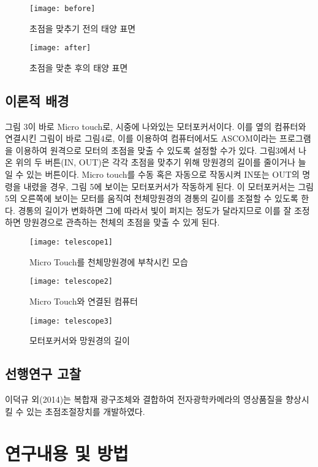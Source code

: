 \documentclass{abstract_hutech}
\begin{document}
\begin{figure}
\centering
\texttt{[image: before]}
\caption{초점을 맞추기 전의 태양 표면}
\label{fig:before}
\end{figure}

\begin{figure}
\centering
\texttt{[image: after]}
\caption{초점을 맞춘 후의 태양 표면}
\label{fig:after}
\end{figure}

\subsection{이론적 배경}

그림 3이 바로 Micro touch로, 시중에 나와있는 모터포커서이다. 이를 옆의 컴퓨터와 연결시킨 그림이 바로 그림4로, 이를 이용하여 컴퓨터에서도 ASCOM이라는 프로그램을 이용하여 원격으로 모터의 초점을 맞출 수 있도록 설정할 수가 있다. 그림3에서 나온 위의 두 버튼(IN, OUT)은 각각 초점을 맞추기 위해 망원경의 길이를 줄이거나 늘일 수 있는 버튼이다. Micro touch를 수동 혹은 자동으로 작동시켜 IN또는 OUT의 명령을 내렸을 경우, 그림 5에 보이는 모터포커서가 작동하게 된다. 이 모터포커서는 그림 5의 오른쪽에 보이는 모터를 움직여 천체망원경의 경통의 길이를 조절할 수 있도록 한다. 경통의 길이가 변화하면 그에 따라서 빛이 퍼지는 정도가 달라지므로 이를 잘 조정하면 망원경으로 관측하는 천체의 초점을 맞출 수 있게 된다.
\begin{figure}
\centering
\texttt{[image: telescope1]}
\caption{Micro Touch를 천체망원경에 부착시킨 모습}
\label{fig:telescope1}
\end{figure}

\begin{figure}
\centering
\texttt{[image: telescope2]}
\caption{Micro Touch와 연결된 컴퓨터}
\label{fig:telescope2}
\end{figure}

\begin{figure}
\centering
\texttt{[image: telescope3]}
\caption{모터포커서와 망원경의 길이}
\label{fig:telescope3}
\end{figure}

\subsection{선행연구 고찰}
이덕규 외(2014)는 복합재 광구조체와 결합하여 전자광학카메라의 영상품질을 향상시킬 수 있는 초점조절장치를 개발하였다.\cite{leedukgu2014}
\section{연구내용 및 방법}
\end{document}
